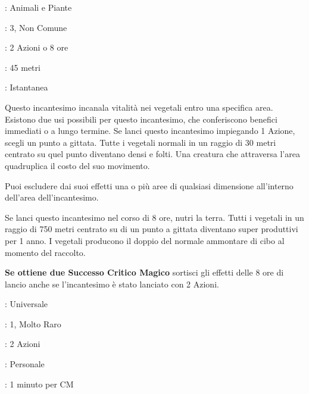 \begin{multicols}{2}
\noindent\colorbox{OBSSgold!10}{
\begin{minipage}{0.95\linewidth}
\begin{description}[noitemsep, topsep=0pt, parsep=0pt, partopsep=0pt, leftmargin=0cm, labelwidth=1.3cm]
	\item[\textbf{Lista}]: Animali e Piante
	\item[\textbf{Livello}]: 3, Non Comune
	\item[\textbf{Lancio}]: 2 Azioni o 8 ore
	\item[\textbf{Gittata}]: 45 metri
	\item[\textbf{Durata}]: Istantanea
\end{description}
\end{minipage}}\smallskip

Questo incantesimo incanala vitalità nei vegetali entro una specifica area. Esistono due usi possibili per questo incantesimo, che conferiscono benefici immediati o a lungo termine. Se lanci questo incantesimo impiegando 1 Azione, scegli un punto a gittata. Tutte i vegetali normali in un raggio di 30 metri centrato su quel punto diventano densi e folti. Una creatura che attraversa l'area quadruplica il costo del suo movimento.

Puoi escludere dai suoi effetti una o più aree di qualsiasi dimensione all'interno dell'area dell'incantesimo.

Se lanci questo incantesimo nel corso di 8 ore, nutri la terra. Tutti i vegetali in un raggio di 750 metri centrato su di un punto a gittata diventano super produttivi per 1 anno. I vegetali producono il doppio del normale ammontare di cibo al momento del raccolto.

\textbf{Se ottiene due Successo Critico Magico} sortisci gli effetti delle 8 ore di lancio anche se l'incantesimo è stato lanciato con 2 Azioni.

\noindent\colorbox{OBSSgold!10}{
\begin{minipage}{0.95\linewidth}
\begin{description}[noitemsep, topsep=0pt, parsep=0pt, partopsep=0pt, leftmargin=0cm, labelwidth=1.3cm]
	\item[\textbf{Lista}]: Universale
	\item[\textbf{Livello}]: 1, Molto Raro
	\item[\textbf{Lancio}]: 2 Azioni
	\item[\textbf{Gittata}]: Personale
	\item[\textbf{Durata}]: 1 minuto per CM
\end{description}
\end{minipage}}\smallskip


\end{multicols}
